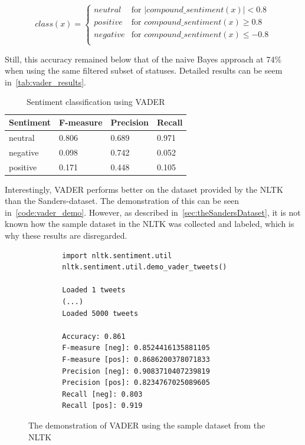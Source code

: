 \begin{equation}
    class(x) =
    \begin{cases}
        neutral & \text{for } |compound\_sentiment(x)| < 0.8 \\
        positive & \text{for } compound\_sentiment(x) \geq 0.8 \\
        negative & \text{for } compound\_sentiment(x) \leq -0.8 \\
    \end{cases}
\end{equation}

Still, this accuracy remained below that of the naive Bayes approach at 74\% when using the same filtered subset of statuses.
Detailed results can be seem in~\autoref{tab:vader_results}.

\begin{table}
    \caption{Sentiment classification using VADER}
    \label{tab:vader_results}
    \centering
    \begin{tabular}{llll} %
        \toprule
        Sentiment
        & F-measure
        & Precision
        & Recall
        \\\midrule
        neutral & 0.806 & 0.689 & 0.971
        \\\midrule
        negative & 0.098 & 0.742 & 0.052
        \\\midrule
        positive & 0.171 & 0.448 & 0.105
        \\\bottomrule
    \end{tabular}
\end{table}

Interestingly, VADER performs better on the dataset provided by the NLTK than the Sanders-dataset.
The demonstration of this can be seen in~\autoref{code:vader_demo}.
However, as described in~\autoref{sec:theSandersDataset}, it is not known how the sample dataset in the NLTK was collected and labeled,
which is why these results are disregarded.

\begin{figure}
    \caption{The demonstration of VADER using the sample dataset from the NLTK}
    \label{code:vader_demo}
    \begin{verbatim}
        import nltk.sentiment.util
        nltk.sentiment.util.demo_vader_tweets()

        Loaded 1 tweets
        (...)
        Loaded 5000 tweets

        Accuracy: 0.861
        F-measure [neg]: 0.8524416135881105
        F-measure [pos]: 0.8686200378071833
        Precision [neg]: 0.9083710407239819
        Precision [pos]: 0.8234767025089605
        Recall [neg]: 0.803
        Recall [pos]: 0.919
    \end{verbatim}
\end{figure}

